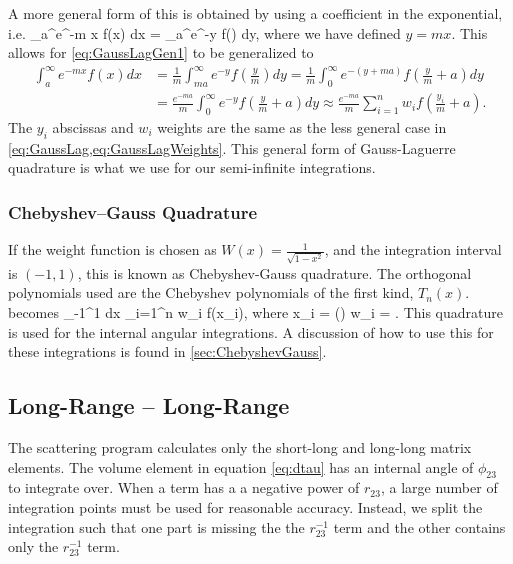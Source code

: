 \documentclass[Dissertation.tex]{subfiles}
\begin{document}
\noindent A more general form of this is obtained by using a coefficient in the exponential, i.e.
\beq
\label{eq:GaussLagGen2}
\int_a^\infty e^{-m x} f(x) dx =  \int_a^\infty e^{-y} f\left(\right) dy,
\eeq
where we have defined $y = m x$.  This allows for \cref{eq:GaussLagGen1} to be generalized to
\begin{align}
\label{eq:GaussLagGen}
\nonumber \int_a^\infty e^{-m x} f(x) dx &= \frac{1}{m} \int_{ma}^\infty e^{-y} f\left(\frac{y}{m}\right) dy = \frac{1}{m} \int_0^\infty e^{-(y+ma)} f\left(\frac{y}{m}+a\right) dy \\
& = \frac{e^{-ma}}{m} \int_0^\infty e^{-y} f\left(\frac{y}{m}+a\right) dy \approx \frac{e^{-ma}}{m} \sum_{i=1}^n w_i f\left(\frac{y_i}{m}+a\right).
\end{align}
The $y_i$ abscissas and $w_i$ weights are the same as the less general case in
\cref{eq:GaussLag,eq:GaussLagWeights}. This general form of Gauss-Laguerre
quadrature is what we use for our semi-infinite integrations.


\subsubsection{Chebyshev--Gauss Quadrature}
\label{sec:ChebyshevGauss1}
If the weight function is chosen as $W(x)=\frac{1}{\sqrt{1-x^2}}$, and the
integration interval is $(-1,1)$, this is known as Chebyshev-Gauss quadrature.
The orthogonal polynomials used are the Chebyshev polynomials of the first
kind, $T_n(x)$.  becomes
\beq
\label{eq:GaussCheb}
\int_{-1}^1  dx \approx \sum_{i=1}^n w_i f(x_i),
\eeq
where
\beq
\label{eq:GaussChebAbsWeights}
x_i = \cos\left(\pi\right)  w_i = .
\eeq
This quadrature is used for the internal angular integrations. A discussion of
how to use this for these integrations is found in \cref{sec:ChebyshevGauss}.

\subsection{Long-Range -- Long-Range}
\label{sec:LongLongInt}

The scattering program calculates only the short-long and long-long matrix 
elements. The volume element in equation \ref{eq:dtau} has an internal angle 
of $\phi_{23}$ to integrate over.  When a term has a a negative power of
$r_{23}$, a large number of integration points must be used for reasonable 
accuracy. Instead, we split the integration such that one part is missing the 
the $r_{23}^{-1}$ term and the other contains only the $r_{23}^{-1}$ term.
\end{document}
